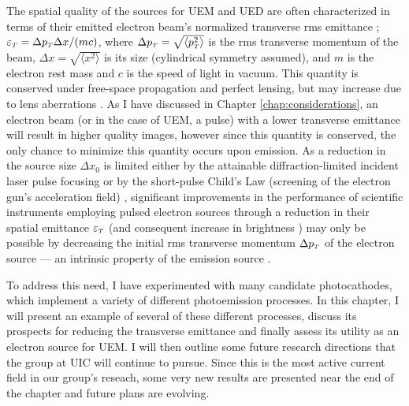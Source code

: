 

The spatial quality of the sources for UEM and UED are often characterized in terms of their emitted electron beam's normalized transverse rms emittance \cite{dowell_quantum_2009,jensen_emittance_2010}; $\varepsilon_{{\scriptscriptstyle T}} = \Delta p_{{\scriptscriptstyle T}} \Delta x / (m c)$, where $\Delta p_{{\scriptscriptstyle T}} = \sqrt{ \langle p_{{\scriptscriptstyle T}}^2 \rangle }$ is the rms transverse momentum of the beam, $\Delta x = \sqrt{ \langle x^2 \rangle }$ is its size (cylindrical symmetry assumed), and $m$ is the electron rest mass and $c$ is the speed of light in vacuum.
This quantity is conserved under free-space propagation and perfect lensing, but may increase due to lens aberrations \cite{oshea_reversible_1998}.
As I have discussed in Chapter \ref{chap:considerations}, an electron beam (or in the case of UEM, a pulse) with a lower transverse emittance will result in higher quality images, however since this quantity is conserved, the only chance to minimize this quantity occurs upon emission.
As a reduction in the source size $\Delta x_0$ is limited either by the attainable diffraction-limited incident laser pulse focusing or by the short-pulse Child's Law (screening of the electron gun's acceleration field) \cite{valfells_effects_2002}, significant improvements in the performance of scientific instruments employing pulsed electron sources through a reduction in their spatial emittance $\varepsilon_{{\scriptscriptstyle T}}$ (and consequent increase in brightness \cite{berger_dc_2009}) may only be possible by decreasing the initial rms transverse momentum $\Delta p_{{\scriptscriptstyle T}}$ of the electron source --- an intrinsic property of the emission source \cite{dowell_quantum_2009,jensen_emittance_2010}.

To address this need, I have experimented with many candidate photocathodes, which implement a variety of different photoemission processes.
In this chapter, I will present an example of several of these different processes, discuss its prospects for reducing the transverse emittance and finally assess its utility as an electron source for UEM.
I will then outline some future research directions that the group at UIC will continue to pursue.
Since this is the most active current field in our group's reseach, some very new results are presented near the end of the chapter and future plans are evolving.

